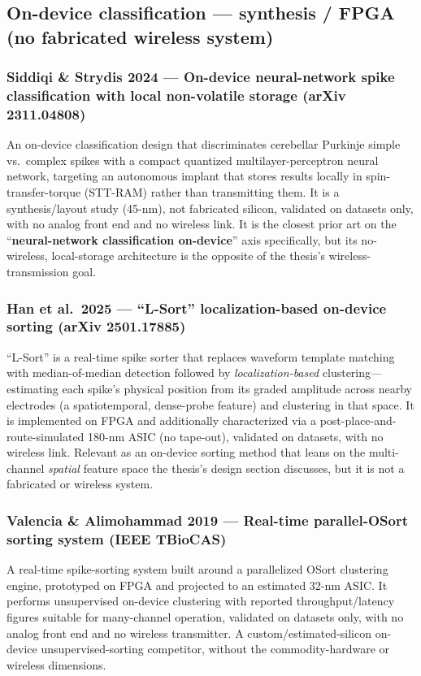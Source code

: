\documentclass[11pt]{article}
\begin{document}
\subsection*{On-device classification --- synthesis / FPGA (no fabricated wireless system)}

\subsubsection*{Siddiqi \& Strydis 2024 --- On-device neural-network spike classification with local non-volatile storage (arXiv 2311.04808)}
An on-device classification design that discriminates cerebellar Purkinje simple vs.\ complex spikes with a compact quantized multilayer-perceptron neural network, targeting an autonomous implant that stores results locally in spin-transfer-torque (STT-RAM) rather than transmitting them. It is a synthesis/layout study (45-nm), not fabricated silicon, validated on datasets only, with no analog front end and no wireless link. It is the closest prior art on the ``\textbf{neural-network classification on-device}'' axis specifically, but its no-wireless, local-storage architecture is the opposite of the thesis's wireless-transmission goal.

\subsubsection*{Han et al.\ 2025 --- ``L-Sort'' localization-based on-device sorting (arXiv 2501.17885)}
``L-Sort'' is a real-time spike sorter that replaces waveform template matching with median-of-median detection followed by \emph{localization-based} clustering---estimating each spike's physical position from its graded amplitude across nearby electrodes (a spatiotemporal, dense-probe feature) and clustering in that space. It is implemented on FPGA and additionally characterized via a post-place-and-route-simulated 180-nm ASIC (no tape-out), validated on datasets, with no wireless link. Relevant as an on-device sorting method that leans on the multi-channel \emph{spatial} feature space the thesis's design section discusses, but it is not a fabricated or wireless system.

\subsubsection*{Valencia \& Alimohammad 2019 --- Real-time parallel-OSort sorting system (IEEE TBioCAS)}
A real-time spike-sorting system built around a parallelized OSort clustering engine, prototyped on FPGA and projected to an estimated 32-nm ASIC. It performs unsupervised on-device clustering with reported throughput/latency figures suitable for many-channel operation, validated on datasets only, with no analog front end and no wireless transmitter. A custom/estimated-silicon on-device unsupervised-sorting competitor, without the commodity-hardware or wireless dimensions.
\end{document}
